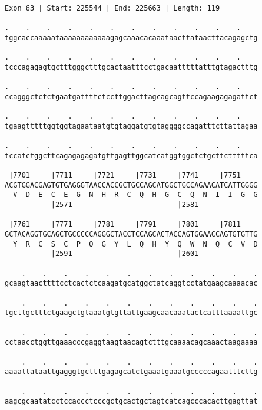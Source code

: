 \documentclass{article}
\begin{document}
\begin{Verbatim}
Exon 63 | Start: 225544 | End: 225663 | Length: 119
 
.    .    .    .    .    .    .    .    .    .    .    .    
tggcaccaaaaataaaaaaaaaaaagagcaaacacaaataacttataacttacagagctg
  
.    .    .    .    .    .    .    .    .    .    .    .    
tcccagagagtgctttgggctttgcactaatttcctgacaatttttatttgtagactttg
  
.    .    .    .    .    .    .    .    .    .    .    .    
ccagggctctctgaatgattttctccttggacttagcagcagttccagaagagagattct
  
.    .    .    .    .    .    .    .    .    .    .    .    
tgaagtttttggtggtagaataatgtgtaggatgtgtaggggccagatttcttattagaa
  
.    .    .    .    .    .    .    .    .    .    .    .    
tccatctggcttcagagagagatgttgagttggcatcatggtggctctgcttctttttca
  
 |7701     |7711     |7721     |7731     |7741     |7751    
ACGTGGACGAGTGTGAGGGTAACCACCGCTGCCAGCATGGCTGCCAGAACATCATTGGGG
  V  D  E  C  E  G  N  H  R  C  Q  H  G  C  Q  N  I  I  G  G
           |2571                         |2581              
  
 |7761     |7771     |7781     |7791     |7801     |7811    
GCTACAGGTGCAGCTGCCCCCAGGGCTACCTCCAGCACTACCAGTGGAACCAGTGTGTTG
  Y  R  C  S  C  P  Q  G  Y  L  Q  H  Y  Q  W  N  Q  C  V  D
           |2591                         |2601              
  
    .    .    .    .    .    .    .    .    .    .    .    .
gcaagtaacttttcctcactctcaagatgcatggctatcaggtcctatgaagcaaaacac
  
    .    .    .    .    .    .    .    .    .    .    .    .
tgcttgctttctgaagctgtaaatgtgttattgaagcaacaaatactcatttaaaattgc
  
    .    .    .    .    .    .    .    .    .    .    .    .
cctaacctggttgaaacccgaggtaagtaacagtctttgcaaaacagcaaactaagaaaa
  
    .    .    .    .    .    .    .    .    .    .    .    .
aaaattataattgagggtgctttgagagcatctgaaatgaaatgcccccagaatttcttg
  
    .    .    .    .    .    .    .    .    .    .    .    .
aagcgcaatatcctccaccctcccgctgcactgctagtcatcagcccacacttgagttat
\end{Verbatim}
\newpage
\end{document}

